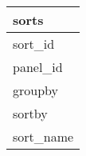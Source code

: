\documentclass{article}
\begin{document}

\begin{tabular}{|l|} \hline
\textbf{sorts} \\ \hline
sort\_id \\ \hline
panel\_id \\ \hline
groupby \\ \hline
sortby \\ \hline
sort\_name \\ \hline
\end{tabular}
\end{document}
